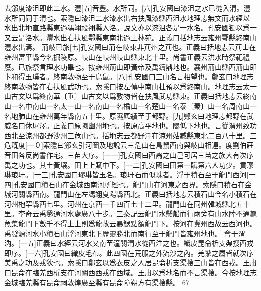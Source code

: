 去邠度漆沮即此二水。灃[五]音豐。水所同。[六]孔安國曰漆沮之水已從入渭。灃水所同同于渭也。索隱曰漆沮二水漆水出右扶風漆縣西沮水地理志無文而水經以水出北地直路縣東過馮翊祋祤縣入洛。說文亦以漆沮各是一水名。孔安國獨以爲一又云是洛水。灃水出右扶風鄠縣東南北過上林苑。正義曰括地志云雍州鄠縣終南山灃水出焉。 荊岐已旅[七]孔安國曰荊在岐東非荊州之荊也。正義曰括地志云荊山在雍州富平縣今名掘陵原。岐山在岐州岐山縣東北十里。尚書正義云洪水時祭祀禮廢。已旅祭言理水功畢也。按雍州荊山即黃帝及禹鑄鼎地也。襄州荊山縣西荊山即卞和得玉璞者。終南敦物至于鳥鼠。[八]孔安國曰三山名言相望也。鄭玄曰地理志終南敦物皆在右扶風武功也。索隱曰按左傳中南山杜預以爲終南山。地理志云太一山古文以爲終南華〔垂〕山古文以爲敦物皆在扶風武功縣東。正義曰括地志云終南山一名中南山一名太一山一名南山一名橘山一名楚山一名泰〔秦〕山一名周南山一名地肺山在雍州萬年縣南五十里。原隰厎績至于都野。[九]鄭玄曰地理志都野在武威名曰休屠澤。正義曰原隰幽州地也。按原高平地也。隰低下地也。言從渭州致功西北至涼州都野沙州三危山也。括地志云都野澤在涼州姑臧縣東北二百八十里。三危旣度[一０]索隱曰鄭玄引河圖及地說云三危山在鳥鼠西南與岐山相連。度劉伯莊音田各反尚書作宅。三苗大序。[一一]孔安國曰西裔之山己可居三苗之族大有次序禹之功也。其土黃壤。田上上賦中下。[一二]孔安國曰田第一賦第六人功少。貢璆琳琅玕。[一三]孔安國曰璆琳皆玉名。琅玕石而似珠者。浮于積石至于龍門西河[一四]孔安國曰積石山在金城西南河所經也。龍門山在河東之西界。索隱曰積石在金城河關縣西南。龍門山在左馮翊夏陽縣西北。正義曰括地志云積石山今名小積石在河州枹罕縣西七里。河州在京西一千四百七十二里。龍門山在同州韓城縣北五十里。李奇云禹鑿通河水處廣八十步。三秦記云龍門水懸船而行兩旁有山水陸不通龜魚集龍門下數千不得上上則爲龍故云暴鰓點額龍門下。按河在冀州西故云西河也。禹發源河水小積石山浮河東北下歷靈勝北而南行至于龍門皆雍州地也。 會于渭汭。[一五]正義曰水經云河水又南至潼關渭水從西注之也。織皮昆侖析支渠搜西戎即序。[一六]孔安國曰織皮毛布。此四國在荒服之外流沙之內。羌髳之屬皆就次序美禹之功及戎狄也。索隱曰鄭玄以爲衣皮之人居昆侖析支渠搜三山皆在西戎。王肅曰昆侖在臨羌西析支在河關西西戎在西域。王肅以爲地名而不言渠搜。今按地理志金城臨羌縣有昆侖祠敦煌廣至縣有昆侖障朔方有渠搜縣。
67
